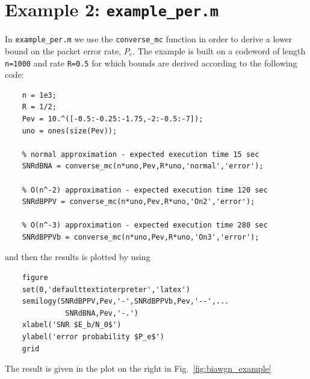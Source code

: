 \documentclass[a4paper,11p]{memoir}
\begin{document}
\section{Example 2: \texttt{example\_per.m}}

In \verb|example_per.m| we use the \verb|converse_mc| function in order to derive a lower bound on the packet error rate, $P_e$. The example is built on a codeword of length \verb|n=1000|  and rate \verb|R=0.5| for which bounds are derived according to  the following code:
\begin{verbatim}
    n = 1e3;
    R = 1/2;
    Pev = 10.^([-0.5:-0.25:-1.75,-2:-0.5:-7]);
    uno = ones(size(Pev));

    % normal approximation - expected execution time 15 sec
    SNRdBNA = converse_mc(n*uno,Pev,R*uno,'normal','error');

    % O(n^-2) approximation - expected execution time 120 sec
    SNRdBPPV = converse_mc(n*uno,Pev,R*uno,'On2','error');

    % O(n^-3) approximation - expected execution time 280 sec
    SNRdBPPVb = converse_mc(n*uno,Pev,R*uno,'On3','error');
\end{verbatim}
and then the results is plotted by using
\begin{verbatim}
    figure
    set(0,'defaulttextinterpreter','latex')
    semilogy(SNRdBPPV,Pev,'-',SNRdBPPVb,Pev,'--',...
              SNRdBNA,Pev,'-.')
    xlabel('SNR $E_b/N_0$')
    ylabel('error probability $P_e$')
    grid
\end{verbatim}
The result is given in the plot on the right in Fig.~\ref{fig:biawgn_example}




\end{document}
